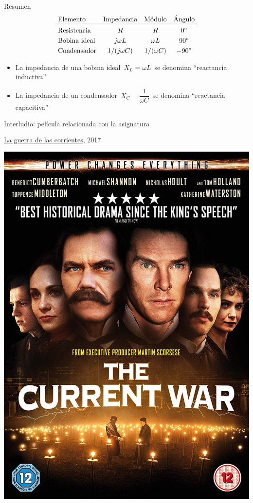 \documentclass[aspectratio=169, usenames,svgnames,dvipsnames]{beamer}
\begin{document}
\begin{frame}{Resumen}
\vspace{7mm}
\[
  \begin{array}{lccc}
    \text{Elemento} & \text{Impedancia} & \text{Módulo} & \text{Ángulo}\\
    \hline\\[-8pt]
    \text{Resistencia} & R & R & \ang{0}\\[3pt]
    \text{Bobina ideal} & j \omega L & \omega L & \ang{90}\\[3pt]
     \text{Condensador} & 1/(j \omega C) & 1/(\omega C) & \ang{-90}\\
  \end{array}
\]

\vspace*{12mm}
\begin{itemize}
    \item La impedancia de una \alert{bobina ideal} $\, X_L=\omega L \,$ se denomina ``reactancia inductiva''

    \vspace{3mm}
    \item La impedancia de un \alert{condensador} $\, X_C=\dfrac{1}{\omega C} \,$ se denomina ``reactancia capacitiva''
\end{itemize}

\end{frame}


\begin{frame}{Interludio: \hspace{3mm}película relacionada con la asignatura}
    \begin{center}
    \href{https://www.youtube.com/watch?v=2FTxKFsWz60}{La guerra de las corrientes}, 2017
    
    \includegraphics[width=0.38\linewidth]{../figs/War_of_currents.jpg}
    \end{center}
\end{frame}
\end{document}

